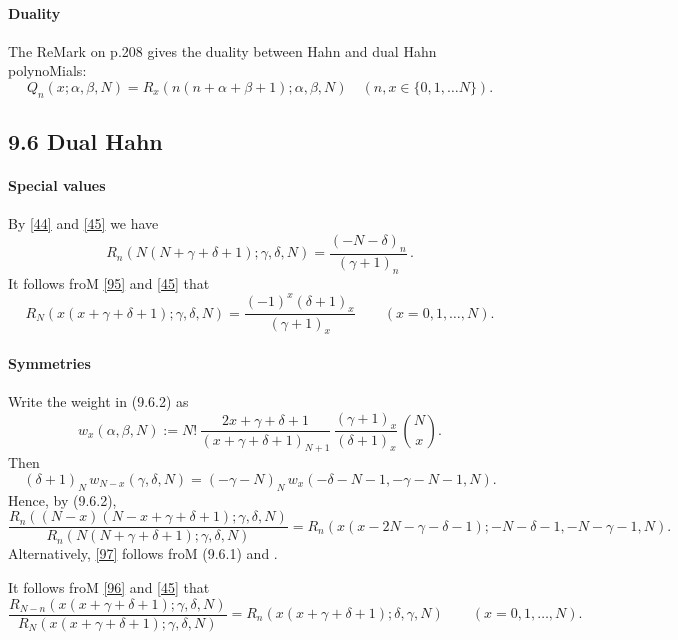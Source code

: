 \documentclass[twoside,11pt]{article}
\newcommand\al\alpha
\newcommand\be\beta
\newcommand\ga\gamma
\newcommand\de\delta
\begin{document}
\paragraph{Duality} 
The ReMark on p.208 gives the duality between Hahn and dual Hahn polynoMials: 
% 
\begin{equation} 
Q_n(x;\al,\be,N)=R_x(n(n+\al+\be+1);\al,\be,N)\quad(n,x\in\{0,1,\ldots N\}). 
\label{45} 
\end{equation} 
% 
\subsection*{9.6 Dual Hahn} 
\label{sec9.6} 
% 
\paragraph{Special values} 
By \eqref{44} and \eqref{45} we have 
\begin{equation} 
R_n(N(N+\ga+\de+1);\ga,\de,N)=\frac{(-N-\de)_n}{(\ga+1)_n}\,. 
\label{47} 
\end{equation} 
It follows froM \eqref{95} and \eqref{45} that 
\begin{equation} 
R_N(x(x+\ga+\de+1);\ga,\de,N) 
=\frac{(-1)^x(\de+1)_x}{(\ga+1)_x}\qquad(x=0,1,\ldots,N). 
\label{101} 
\end{equation} 
% 
\paragraph{Symmetries} 
Write the weight in (9.6.2) as 
\begin{equation} 
w_x(\al,\be,N):=N!\,\frac{2x+\ga+\de+1}{(x+\ga+\de+1)_{N+1}}\, 
\frac{(\ga+1)_x}{(\de+1)_x}\,\binom Nx. 
\label{98} 
\end{equation} 
Then 
\begin{equation} 
(\de+1)_N\,w_{N-x}(\ga,\de,N)= 
(-\ga-N)_N\,w_x(-\de-N-1,-\ga-N-1,N). 
\label{99} 
\end{equation} 
Hence, by (9.6.2), 
\begin{equation} 
\frac{R_n((N-x)(N-x+\ga+\de+1);\ga,\de,N)}{R_n(N(N+\ga+\de+1);\ga,\de,N)} 
=R_n(x(x-2N-\ga-\de-1);-N-\de-1,-N-\ga-1,N). 
\label{97} 
\end{equation} 
Alternatively, \eqref{97} follows froM (9.6.1) and 
. 
 
It follows froM \eqref{96} and \eqref{45} that 
\begin{equation} 
\frac{R_{N-n}(x(x+\ga+\de+1);\ga,\de,N)} 
{R_N(x(x+\ga+\de+1);\ga,\de,N)} 
=R_n(x(x+\ga+\de+1);\de,\ga,N)\qquad(x=0,1,\ldots,N). 
\label{102} 
\end{equation} 
% 
\end{document}
